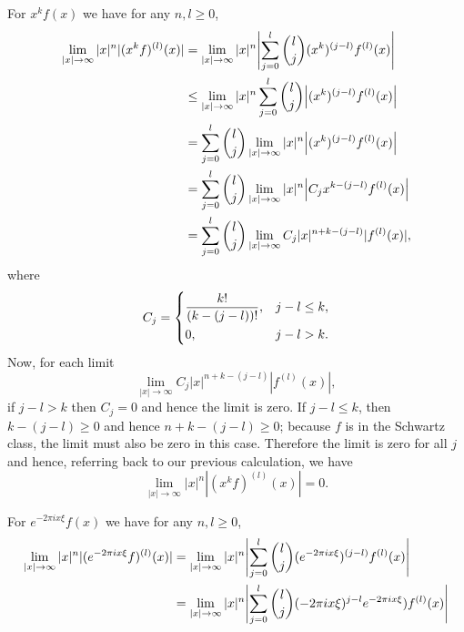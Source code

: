 \documentclass{article}
\begin{document}
For $x^k f(x)$ we have for any $n, l \geq 0$,
%
\begin{align*}
    \lim_{|x| \to \infty} |x|^n |(x^k f)^{(l)}(x)|
        &= \lim_{|x| \to \infty} |x|^n \envert[4]{\sum_{j = 0}^l \binom{l}{j} (x^k)^{(j - l)} f^{(l)}(x)} \\
        &\leq \lim_{|x| \to \infty} |x|^n \sum_{j = 0}^l \binom{l}{j} \envert{(x^k)^{(j - l)} f^{(l)}(x)} \\
        &= \sum_{j = 0}^l \binom{l}{j} \lim_{|x| \to \infty} |x|^n \envert{(x^k)^{(j - l)} f^{(l)}(x)} \\
        &= \sum_{j = 0}^l \binom{l}{j} \lim_{|x| \to \infty} |x|^n \envert{C_j x^{k - (j - l)} f^{(l)}(x)} \\
        &= \sum_{j = 0}^l \binom{l}{j} \lim_{|x| \to \infty} C_j |x|^{n + k - (j - l)} |f^{(l)}(x)|
        ,
\end{align*}
%
where
%
\begin{equation*}
    C_j =
    \begin{dcases}
        \frac{k!}{(k - (j - l))!}, & j - l \leq k, \\
        0, & j - l > k.
    \end{dcases}
\end{equation*}
%
Now, for each limit
%
\begin{equation*}
    \lim_{|x| \to \infty} C_j |x|^{n + k - (j - l)} |f^{(l)}(x)|
    ,
\end{equation*}
%
if $j - l > k$ then $C_j = 0$ and hence the limit is zero. If
$j - l \leq k$, then $k - (j - l) \geq 0$ and hence $n + k - (j - l) \geq 0$;
because $f$ is in the Schwartz class, the limit must also be zero in this case.
Therefore the limit is zero for all $j$ and hence, referring back to our previous
calculation, we have
%
\begin{equation*}
    \lim_{|x| \to \infty} |x|^n |(x^k f)^{(l)}(x)| = 0
    .
\end{equation*}

For $e^{- 2 \pi i x \xi} f(x)$ we have for any $n, l \geq 0$,
%
\begin{align*}
    \lim_{|x| \to \infty} |x|^n |(e^{- 2 \pi i x \xi} f)^{(l)}(x)|
        &= \lim_{|x| \to \infty} |x|^n \envert[4]{\sum_{j = 0}^l \binom{l}{j} (e^{- 2 \pi i x \xi})^{(j - l)} f^{(l)}(x)} \\
        &= \lim_{|x| \to \infty} |x|^n \envert[4]{\sum_{j = 0}^l \binom{l}{j} (- 2 \pi i x \xi)^{j - l} e^{- 2 \pi i x \xi}) f^{(l)}(x)} \\
\end{align*}
\end{document}
